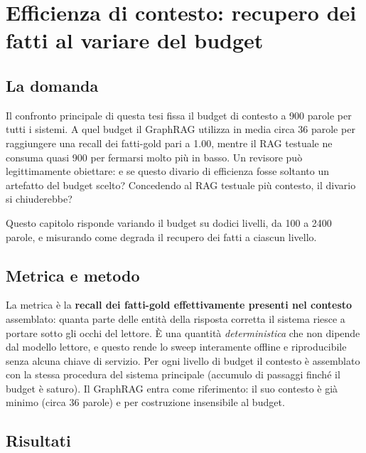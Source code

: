 \documentclass[11pt,a4paper]{report}
\begin{document}
\chapter{Efficienza di contesto: recupero dei fatti al variare del budget}
\label{ch:efficienza-contesto}

\section{La domanda}

Il confronto principale di questa tesi fissa il budget di contesto a
\num{900} parole per tutti i sistemi. A quel budget il GraphRAG utilizza in
media circa \num{36} parole per raggiungere una recall dei fatti-gold pari a
\num{1,00}, mentre il RAG testuale ne consuma quasi \num{900} per fermarsi
molto più in basso. Un revisore può legittimamente obiettare: e se questo
divario di efficienza fosse soltanto un artefatto del budget scelto?
Concedendo al RAG testuale più contesto, il divario si chiuderebbe?

Questo capitolo risponde variando il budget su dodici livelli, da \num{100} a
\num{2400} parole, e misurando come degrada il recupero dei fatti a ciascun
livello.

\section{Metrica e metodo}

La metrica è la \textbf{recall dei fatti-gold effettivamente presenti nel
contesto} assemblato: quanta parte delle entità della risposta corretta il
sistema riesce a portare sotto gli occhi del lettore. È una quantità
\emph{deterministica} che non dipende dal modello lettore, e questo rende lo
sweep interamente offline e riproducibile senza alcuna chiave di servizio.
Per ogni livello di budget il contesto è assemblato con la stessa procedura
del sistema principale (accumulo di passaggi finché il budget è saturo). Il
GraphRAG entra come riferimento: il suo contesto è già minimo (circa \num{36}
parole) e per costruzione insensibile al budget.

\section{Risultati}
\end{document}
